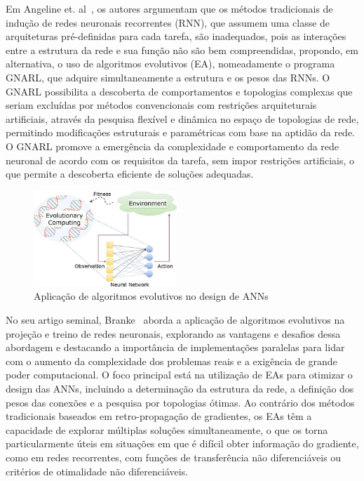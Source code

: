 \documentclass[conference]{IEEEtran}
\begin{document}
Em Angeline et. al~\cite{Angeline1994AnNetworks}, os autores argumentam que os métodos tradicionais de indução de redes neuronais recorrentes (RNN), que assumem uma classe de arquiteturas pré-definidas para cada tarefa, são inadequados, pois as interações entre a estrutura da rede e sua função não são bem compreendidas, propondo, em alternativa, o uso de algoritmos evolutivos (EA), nomeadamente o programa GNARL, que adquire simultaneamente a estrutura e os pesos das RNNs. O GNARL possibilita a descoberta de comportamentos e topologias complexas que seriam excluídas por métodos convencionais com restrições arquiteturais artificiais, através da pesquisa flexível e dinâmica no espaço de topologias de rede, permitindo modificações estruturais e paramétricas com base na aptidão da rede. O GNARL promove a emergência da complexidade e comportamento da rede neuronal de acordo com os requisitos da tarefa, sem impor restrições artificiais, o que permite a descoberta eficiente de soluções adequadas.

\begin{figure}[htbp]
    \centering
    \includegraphics[width=0.48\textwidth]{imagens/evo_alg.jpg}
    \caption{Aplicação de algoritmos evolutivos no design de ANNs~\cite{Darwish2020ALearning}}
    \label{fig:evo_alg}
\end{figure}

No seu artigo seminal, Branke~\cite{Branke1995EvolutionaryTraining} aborda a aplicação de algoritmos evolutivos na projeção e treino de redes neuronais, explorando as vantagens e desafios dessa abordagem e destacando a importância de implementações paralelas para lidar com o aumento da complexidade dos problemas reais e a exigência de grande poder computacional. O foco principal está na utilização de EAs para otimizar o design das ANNs, incluindo a determinação da estrutura da rede, a definição dos pesos das conexões e a pesquisa por topologias ótimas. Ao contrário dos métodos tradicionais baseados em retro-propagação de gradientes, os EAs têm a capacidade de explorar múltiplas soluções simultaneamente, o que os torna particularmente úteis em situações em que é difícil obter informação do gradiente, como em redes recorrentes, com funções de transferência não diferenciáveis ou critérios de otimalidade não diferenciáveis.
\end{document}
